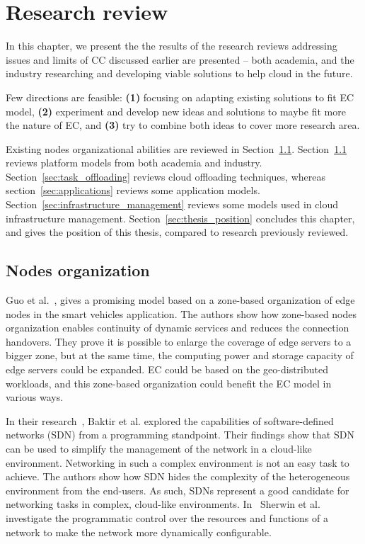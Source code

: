 \chapter{Research review}\label{chapter:Review}
%
In this chapter, we present the the results of the research reviews addressing issues and limits of CC discussed earlier are presented -- both academia, and the industry researching and developing viable solutions to help cloud in the future. 

Few directions are feasible: \textbf{(1)} focusing on adapting existing solutions to fit EC model, \textbf{(2)} experiment and develop new ideas and solutions to maybe fit more the nature of EC, and \textbf{(3)} try to combine both ideas to cover more research area.

Existing nodes organizational abilities are reviewed in Section~\ref{sec:nodes_organization}. Section~\ref{sec:nodes_organization} reviews platform models from both academia and industry. Section~\ref{sec:task_offloading} reviews cloud offloading techniques, whereas section~\ref{sec:applications} reviews some application models. Section~\ref{sec:infrastructure_management} reviews some models used in cloud infrastructure management. Section~\ref{sec:thesis_position} concludes this chapter, and gives the position of this thesis, compared to research previously reviewed.
%
%
\section{Nodes organization}\label{sec:nodes_organization}
Guo et al.~\cite{GuoRG20}, gives a promising model based on a zone-based organization of edge nodes in the smart vehicles application. The authors show how zone-based nodes organization enables continuity of dynamic services and reduces the connection handovers. They prove it is possible to enlarge the coverage of edge servers to a bigger zone, but at the same time, the computing power and storage capacity of edge servers could be expanded. EC could be based on the geo-distributed workloads, and this zone-based organization could benefit the EC model in various ways. 

In their research~\cite{BaktirOE17}, Baktir et al. explored the capabilities of software-defined networks (SDN) from a programming standpoint. Their findings show that SDN can be used to simplify the management of the network in a cloud-like environment. Networking in such a complex environment is not an easy task to achieve. The authors show how SDN hides the complexity of the heterogeneous environment from the end-users. As such, SDNs represent a good candidate for networking tasks in complex, cloud-like environments. In~\cite{abs-2106-10014} Sherwin et al. investigate the programmatic control over the resources and functions of a network to make the network more dynamically configurable.

